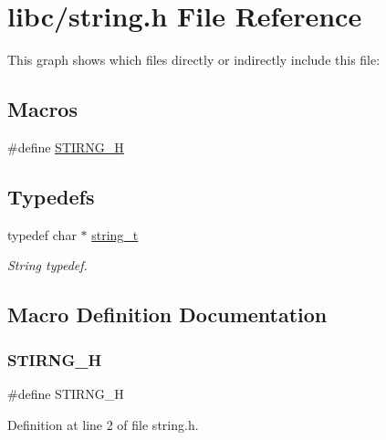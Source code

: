 \hypertarget{a00023}{}\section{libc/string.h File Reference}
\label{a00023}
This graph shows which files directly or indirectly include this file\+:
\subsection*{Macros}
\begin{DoxyCompactItemize}
\item 
\#define \hyperlink{a00023_a5338bd16a174527274acc5062483b702_a5338bd16a174527274acc5062483b702}{S\+T\+I\+R\+N\+G\+\_\+H}
\end{DoxyCompactItemize}
\subsection*{Typedefs}
\begin{DoxyCompactItemize}
\item 
typedef char $\ast$ \hyperlink{a00023_ab0dcbec9b4b3c60b939b1095f93cb1b9_ab0dcbec9b4b3c60b939b1095f93cb1b9}{string\+\_\+t}
\begin{DoxyCompactList}\small\item\em String typedef. \end{DoxyCompactList}\end{DoxyCompactItemize}


\subsection{Macro Definition Documentation}
\mbox{\label{a00023_a5338bd16a174527274acc5062483b702_a5338bd16a174527274acc5062483b702}} 
\subsubsection{\texorpdfstring{S\+T\+I\+R\+N\+G\+\_\+H}{STIRNG\_H}}
{\footnotesize\ttfamily \#define S\+T\+I\+R\+N\+G\+\_\+H}



Definition at line 2 of file string.\+h.




